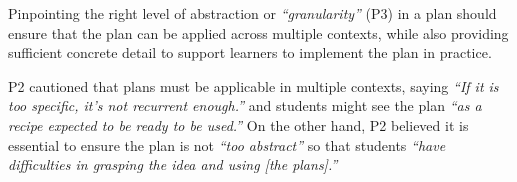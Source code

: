
Pinpointing the right level of abstraction or \textit{``granularity''} (P3) in a plan should ensure that the plan can be applied across multiple contexts, while also providing sufficient concrete detail to support learners to implement the plan in practice. 




P2 cautioned that plans must be applicable in multiple contexts, saying \textit{``If it is too specific, it's not recurrent enough.''} and students might see the plan \textit{``as a recipe expected to be ready to be used.''} On the other hand, P2 believed it is essential to ensure the plan is not \textit{``too abstract''} so that students \textit{``have difficulties in grasping the idea and using [the plans].''}


